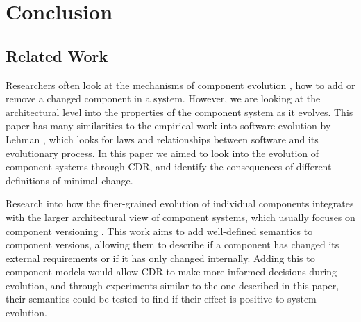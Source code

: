 \chapter{Conclusion}
\label{conclusion}














\section{Related Work}
Researchers often look at the mechanisms of component evolution \cite{Wang2006}, how to add or remove a changed component in a system.  
However, we are looking at the architectural level into the properties of the component system as it evolves.
This paper has many similarities to the empirical work into software evolution by Lehman \cite{lehman1980},
which looks for laws and relationships between software and its evolutionary process.
In this paper we aimed to look into the evolution of component systems through CDR,
and identify the consequences of different definitions of minimal change. 

Research into how the finer-grained evolution of individual components integrates with the larger architectural view of component systems, which
usually focuses on component versioning \cite{Bauml2009,Stuckenholz2005}.
This work aims to add well-defined semantics to component versions, 
allowing them to describe if a component has changed its external requirements or if it has only changed internally.
Adding this to component models would allow CDR to make more informed decisions during evolution, 
and through experiments similar to the one described in this paper,
their semantics could be tested to find if their effect is positive to system evolution.

